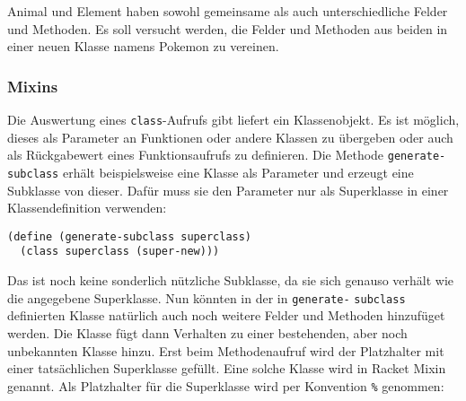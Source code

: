 Animal und Element haben sowohl gemeinsame als auch unterschiedliche Felder und Methoden. Es soll versucht werden, die Felder und Methoden aus beiden in einer neuen Klasse namens Pokemon zu vereinen. 



\subsubsection{Mixins}
Die Auswertung eines \texttt{class}-Aufrufs gibt liefert ein Klassenobjekt. Es ist möglich, dieses als Parameter an Funktionen oder andere Klassen zu übergeben oder auch als Rückgabewert eines Funktionsaufrufs zu definieren. Die Methode \texttt{generate-subclass} erhält beispielsweise eine Klasse als Parameter und erzeugt eine Subklasse von dieser. Dafür muss sie den Parameter nur als Superklasse in einer Klassendefinition verwenden:

\begin{lstlisting}
(define (generate-subclass superclass)
  (class superclass (super-new)))
\end{lstlisting} 

Das ist noch keine sonderlich nützliche Subklasse, da sie sich genauso verhält wie die angegebene Superklasse.
% 
% 
% 
% 
% 
Nun könnten in der in \texttt{generate-} \texttt{subclass} definierten Klasse natürlich auch noch weitere Felder und Methoden hinzufüget werden. Die Klasse fügt dann Verhalten zu einer bestehenden, aber noch unbekannten Klasse hinzu. Erst beim Methodenaufruf wird der Platzhalter mit einer tatsächlichen Superklasse gefüllt. Eine solche Klasse wird in Racket Mixin genannt. Als Platzhalter für die Superklasse wird per Konvention \texttt{\%} genommen:

